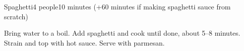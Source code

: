 \documentclass[../Cookbook.tex]{subfiles}
\begin{document}
\begin{recipe}{Spaghetti}{4 people}{10 minutes (+60 minutes if making spaghetti sauce from scratch)}

Bring water to a boil. Add spaghetti and cook until done, about 5--8 minutes. Strain and top with hot sauce. Serve with parmesan.

\end{recipe}
\end{document}
